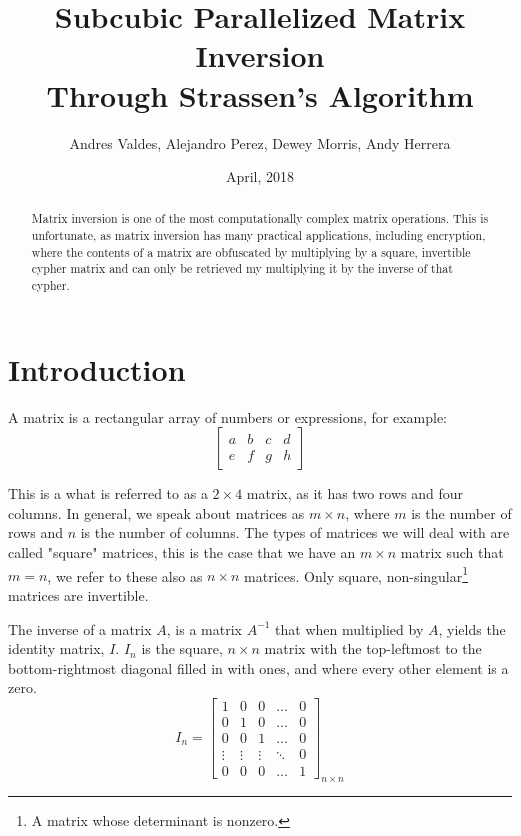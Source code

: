 \documentclass[12pt, letterpaper]{article}
\title{Subcubic Parallelized Matrix Inversion \\
	\large Through Strassen's Algorithm}
\author{Andres Valdes, Alejandro Perez, Dewey Morris, Andy Herrera}
\date{April, 2018}
\theoremstyle{remark}
\theoremstyle{remark}
\begin{document}
    \begin{titlepage}
        \maketitle
        \thispagestyle{empty}

    \end{titlepage}

    \begin{abstract}
        
        Matrix inversion is one of the most computationally complex 
        matrix operations. This is unfortunate, as matrix inversion 
        has many practical applications, including encryption, where the 
        contents of a matrix are obfuscated by multiplying by a square,
        invertible cypher matrix and can only be retrieved my multiplying
        it by the inverse of that cypher.

    \end{abstract}

    \pagebreak

    \section{Introduction}

    \noindent 
    A matrix is a rectangular array of numbers or expressions, for example: 
    \[\begin{bmatrix*}
        a & b & c & d \\
        e & f & g & h
    \end{bmatrix*}\]

    This is a what is referred to as a \(2\times{4}\) matrix, as it 
    has two rows and four columns. In general, we speak about matrices as 
    \(m\times{n}\), where \(m\) is the number of rows and \(n\) is the number 
    of columns. The types of matrices we will deal with are called "square" 
    matrices, this is the case that we have an \(m\times{n}\) matrix such that 
    \(m = n\), we refer to these also as \(n\times{n}\) matrices. Only square, 
    non-singular\footnote{A matrix whose determinant is nonzero.} 
    matrices are invertible.

    The inverse of a matrix \(A\), is a matrix \(A^{-1}\) that when multiplied by \(A\), 
    yields the identity matrix, \(I\). \(I_n\) is the square, \(n\times{n}\) 
    matrix with the top-leftmost to the bottom-rightmost diagonal filled in 
    with ones, and where every other element is a zero.
    \[I_n = \begin{bmatrix*}
        1 & 0 & 0 & \dots & 0 \\
        0 & 1 & 0 & \dots & 0 \\
        0 & 0 & 1 & \dots & 0 \\
        \vdots & \vdots & \vdots & \ddots & 0 \\
        0 & 0 & 0 & \dots & 1
    \end{bmatrix*}_{n\times n}\]
\end{document}

